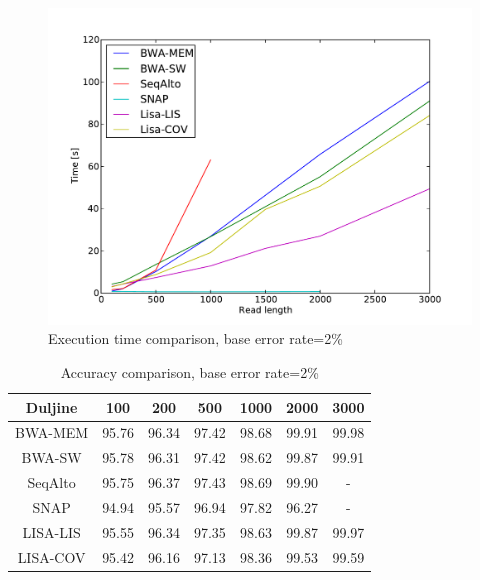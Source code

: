 \documentclass[times, utf8, diplomski]{fer}
\begin{document}
\begin{figure}[H]
\centering
\includegraphics[width=1.0\textwidth]{../img/yersinia-e02-time.pdf}
\caption{Execution time comparison, base error rate=2\%}\label{yersinia-e02-time}
\end{figure}

\begin{table}[H]
\centering
\begin{tabular}{|c||c|c|c|c|c|c|}
\hline
	Duljine & 100 & 200 & 500 & 1000 & 2000 & 3000\\
\hline
\hline
	BWA-MEM & 95.76 & 96.34 & 97.42 & 98.68 & 99.91 & 99.98\\
\hline
	BWA-SW  & 95.78 & 96.31 & 97.42 & 98.62 & 99.87 & 99.91\\
\hline
	SeqAlto & 95.75 & 96.37 & 97.43 & 98.69 & 99.90 & -\\
\hline
	SNAP    & 94.94 & 95.57 & 96.94 & 97.82 & 96.27 & -\\
\hline
	LISA-LIS   & 95.55 & 96.34 & 97.35 & 98.63 & 99.87 & 99.97\\
\hline
	LISA-COV    & 95.42 & 96.16 & 97.13 & 98.36 & 99.53 & 99.59\\
\hline
\end{tabular}
\caption{Accuracy comparison, base error rate=2\%}\label{yersinia-e02-correct}
\end{table}
\end{document}

